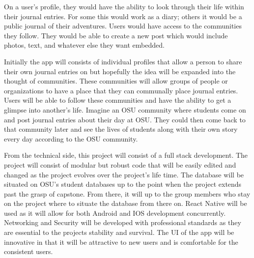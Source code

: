 \documentclass[letterpaper,10pt,titlepage]{article}
\begin{document}
On a user's profile, they would have the ability to look through their life within 
their journal entries. For some this would work as a diary; others it would be a 
public journal of their adventures. Users would have access to the communities 
they follow. They would be able to create a new post which would include photos, 
text, and whatever else they want embedded.

Initially the app will consists of individual profiles that allow a person to share 
their own journal entries on but hopefully the idea will be expanded into the thought 
of communities. These communities will allow groups of people or organizations to have 
a place that they can communally place journal entries. Users will be able to follow these 
communities and have the ability to get a glimpse into another's life. Imagine an OSU community where
 students come on and post journal entries about their day at OSU. They could then come 
 back to that community later and see the lives of students along with their own story 
 every day according to the OSU community.  

From the technical side, this project will consist of a full stack development. 
The project will consist of modular but robust code that will be easily edited 
and changed as the project evolves over the project's life time. The database will
be situated on OSU's student databases up to the point when the project extends past
the grasp of capstone. From there, it will up to the group members who stay on the
project where to situate the database from there on. React Native will be used
as it will allow for both Android and IOS development concurrently. Networking and
Security will be developed with professional standards as they are essential to the
projects stability and survival. The UI of the app will be innovative in that it will
be attractive to new users and is comfortable for the consistent users.
\end{document}
